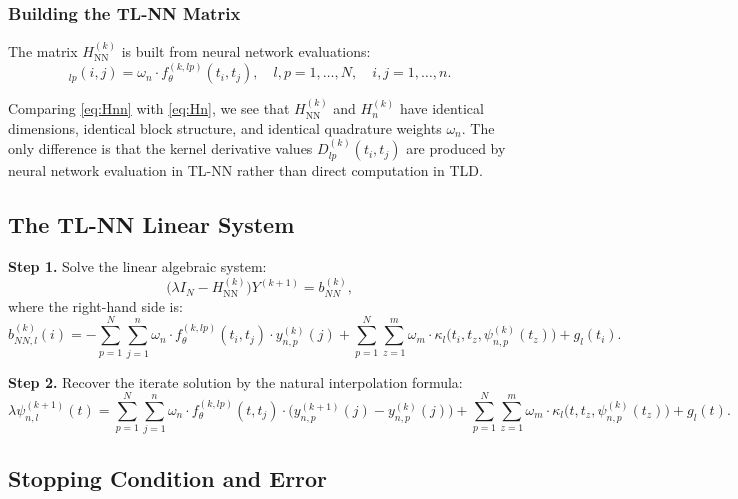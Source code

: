 \documentclass[12pt, a4paper]{article}
\newcommand{\HNN}{H_{\mathrm{NN}}^{(k)}}
\newcommand{\Hn}{H_{n}^{(k)}}
\newcommand{\ftheta}{f_{\theta}^{(k,lp)}}
\begin{document}
\subsubsection{Building the TL-NN Matrix}

The matrix $\HNN$ is built from neural network evaluations:
\begin{equation}
  [\HNN]_{lp}(i,j) =
  \omega_n \cdot \ftheta(t_i, t_j),
  \quad l, p = 1, \ldots, N,
  \quad i, j = 1, \ldots, n.
  \label{eq:Hnn}
\end{equation}

Comparing \eqref{eq:Hnn} with \eqref{eq:Hn}, we see that
$\HNN$ and $\Hn$ have identical dimensions, identical block
structure, and identical quadrature weights $\omega_n$.
The only difference is that the kernel derivative values
$D_{lp}^{(k)}(t_i, t_j)$ are produced by neural network
evaluation in TL-NN rather than direct computation in TLD.

\subsection{The TL-NN Linear System}

\textbf{Step 1.} Solve the linear algebraic system:
\begin{equation}
  \bigl(\lambda I_N - \HNN\bigr) Y^{(k+1)} = b_{NN}^{(k)},
  \label{eq:linsys_tlnn}
\end{equation}
where the right-hand side is:
\begin{equation}
  b_{NN,l}^{(k)}(i) =
  - \sum_{p=1}^{N} \sum_{j=1}^{n}
    \omega_n \cdot \ftheta(t_i, t_j)
    \cdot y_{n,p}^{(k)}(j)
  + \sum_{p=1}^{N} \sum_{z=1}^{m}
    \omega_m \cdot \kappa_l\!\bigl(t_i, t_z,
    \psi_{n,p}^{(k)}(t_z)\bigr)
  + g_l(t_i).
  \label{eq:rhs_tlnn}
\end{equation}

\textbf{Step 2.} Recover the iterate solution by the natural
interpolation formula:
\begin{equation}
  \lambda \psi_{n,l}^{(k+1)}(t) =
  \sum_{p=1}^{N} \sum_{j=1}^{n}
  \omega_n \cdot \ftheta(t, t_j)
  \cdot \bigl(y_{n,p}^{(k+1)}(j) - y_{n,p}^{(k)}(j)\bigr)
  + \sum_{p=1}^{N} \sum_{z=1}^{m}
  \omega_m \cdot \kappa_l\!\bigl(t, t_z,
  \psi_{n,p}^{(k)}(t_z)\bigr)
  + g_l(t).
  \label{eq:interp_tlnn}
\end{equation}

\subsection{Stopping Condition and Error}
\end{document}
